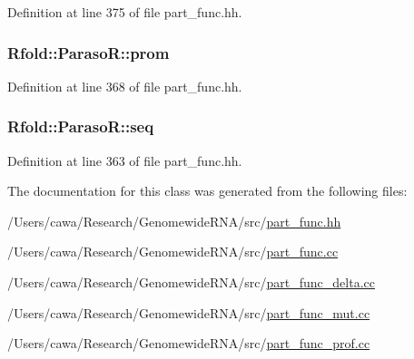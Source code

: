 Definition at line 375 of file part\+\_\+func.\+hh.

\hypertarget{class_rfold_1_1_paraso_r_ad4b227950cd3ec1df3581d9c474777e5}{
\subsubsection[{prom}]{ Rfold\+::\+Paraso\+R\+::prom}}\label{class_rfold_1_1_paraso_r_ad4b227950cd3ec1df3581d9c474777e5}


Definition at line 368 of file part\+\_\+func.\+hh.

\hypertarget{class_rfold_1_1_paraso_r_a5f61516d848cce0e2a93b2d3e22f63ea}{
\subsubsection[{seq}]{ Rfold\+::\+Paraso\+R\+::seq}}\label{class_rfold_1_1_paraso_r_a5f61516d848cce0e2a93b2d3e22f63ea}


Definition at line 363 of file part\+\_\+func.\+hh.



The documentation for this class was generated from the following files\+:\begin{DoxyCompactItemize}
\item 
/\+Users/cawa/\+Research/\+Genomewide\+R\+N\+A/src/\hyperlink{part__func_8hh}{part\+\_\+func.\+hh}\item 
/\+Users/cawa/\+Research/\+Genomewide\+R\+N\+A/src/\hyperlink{part__func_8cc}{part\+\_\+func.\+cc}\item 
/\+Users/cawa/\+Research/\+Genomewide\+R\+N\+A/src/\hyperlink{part__func__delta_8cc}{part\+\_\+func\+\_\+delta.\+cc}\item 
/\+Users/cawa/\+Research/\+Genomewide\+R\+N\+A/src/\hyperlink{part__func__mut_8cc}{part\+\_\+func\+\_\+mut.\+cc}\item 
/\+Users/cawa/\+Research/\+Genomewide\+R\+N\+A/src/\hyperlink{part__func__prof_8cc}{part\+\_\+func\+\_\+prof.\+cc}\end{DoxyCompactItemize}
